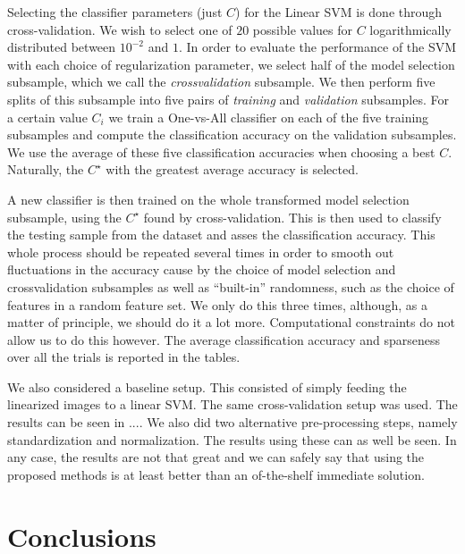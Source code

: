 \documentclass[12pt,a4paper,oneside,english]{UPBThesis}
\begin{document}
Selecting the classifier parameters (just $C$) for the Linear SVM is done through cross-validation. We wish to select one of $20$ possible values for $C$ logarithmically distributed between $10^{-2}$ and $1$. In order to evaluate the performance of the SVM with each choice of regularization parameter, we select half of the model selection subsample, which we call the \emph{crossvalidation} subsample. We then perform five splits of this subsample into five pairs of \emph{training} and \emph{validation} subsamples. For a certain value $C_i$ we train a One-vs-All classifier on each of the five training subsamples and compute the classification accuracy on the validation subsamples. We use the average of these five classification accuracies when choosing a best $C$. Naturally, the $C^\star$ with the greatest average accuracy is selected.

A new classifier is then trained on the whole transformed model selection subsample, using the $C^\star$ found by cross-validation. This is then used to classify the testing sample from the dataset and asses the classification accuracy. This whole process should be repeated several times in order to smooth out fluctuations in the accuracy cause by the choice of model selection and crossvalidation subsamples as well as ``built-in'' randomness, such as the choice of features in a random feature set. We only do this three times, although, as a matter of principle, we should do it a lot more. Computational constraints do not allow us to do this however. The average classification accuracy and sparseness over all the trials is reported in the tables.

We also considered a baseline setup. This consisted of simply feeding the linearized images to a linear SVM. The same cross-validation setup was used. The results can be seen in .... We also did two alternative pre-processing steps, namely standardization and normalization. The results using these can as well be seen. In any case, the results are not that great and we can safely say that using the proposed methods is at least better than an of-the-shelf immediate solution.

\chapter{Conclusions}
\label{chap:Conclusions}




\appendix
\end{document}
